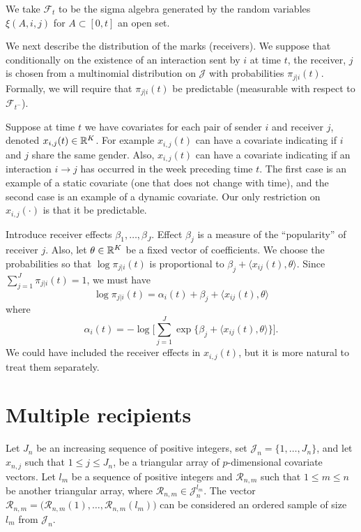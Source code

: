 \documentclass[aoas,preprint]{imsart}
\begin{document}
We take $\mathcal{F}_t$ to be the sigma algebra generated by the
random variables $\xi(A, i, j)$ for $A \subset [0,t]$ an open set.

We next describe the distribution of the marks (receivers). We suppose that
conditionally on the existence of an interaction sent by $i$ at time $t$, the
receiver, $j$ is chosen from a multinomial distribution on $\mathcal{J}$ with
probabilities $\pi_{j | i}(t)$. Formally, we will require that $\pi_{j |
i}(t)$ be predictable (measurable with respect to $\mathcal{F}_{t^-}$).

Suppose at time $t$ we have covariates for each pair of sender $i$ and
receiver $j$, denoted $x_{i,j}(t) \in \mathbb{R}^K$. For example $x_{i,j}(t)$ can
have a covariate indicating if $i$ and $j$ share the same gender. Also,
$x_{i,j}(t)$ can have a covariate indicating if an interaction $i \to j$ has
occurred in the week preceding time $t$. The first case is an example of a
static covariate (one that does not change with time), and the second case is
an example of a dynamic covariate. Our only restriction on $x_{i,j}(\cdot)$ is
that it be predictable.

Introduce receiver effects $\beta_1, \ldots, \beta_J$.  Effect $\beta_j$ is
a measure of the ``popularity'' of receiver $j$.  Also, let $\theta \in \mathbb{R}^K$ be a fixed vector of coefficients.  We choose the probabilities so that $\log \pi_{j|i}(t)$ is proportional to $\beta_j + \langle x_{ij}(t), \theta \rangle$.  Since $\sum_{j=1}^{J} \pi_{j|i}(t) = 1$, we must have
\[
    \log \pi_{j|i}(t)
    = \alpha_i(t) + \beta_j + \langle x_{ij}(t), \theta \rangle
\]
where
\[
    \alpha_i(t)
    = -\log\Big[
        \sum_{j=1}^J \exp\{\beta_j +  \langle x_{ij}(t), \theta \rangle\}
    \Big].
\]
We could have included the receiver effects in $x_{i,j}(t)$, but it is more
natural to treat them separately.

\clearpage

\section{Multiple recipients}

Let $J_n$ be an increasing sequence of positive integers, set
$\mathcal{J}_n = \{ 1, \ldots, J_n \}$, and
let $x_{n,j}$ such that $1 \leq j \leq J_n$, be a triangular array of
$p$-dimensional covariate vectors.  Let $l_m$ be a sequence of positive
integers and $\mathcal{R}_{n,m}$ such that
$1 \leq m \leq n$ be another triangular array, where
$\mathcal{R}_{n,m} \in \mathcal{J}_n^{l_m}$.  The vector
\(
    \mathcal{R}_{n,m}
    =
    \big(
        \mathcal{R}_{n,m}(1), \ldots, \mathcal{R}_{n,m}(l_m)
    \big)
\)
can be considered an ordered sample of size $l_m$ from $\mathcal{J}_n$.
\end{document}
